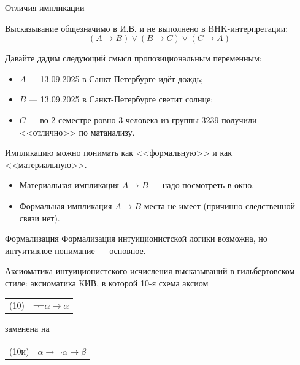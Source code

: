 \documentclass[aspectratio=169]{beamer}
\begin{document}
\begin{frame}{Отличия импликации}

Высказывание общезначимо в И.В. и не выполнено в BHK-интерпретации:
$$(A \rightarrow B) \vee (B \rightarrow C) \vee (C \rightarrow A)$$\pause

Давайте дадим следующий смысл пропозициональным переменным:
\begin{itemize}
\item $A$ --- 13.09.2025 в Санкт-Петербурге идёт дождь;
\item $B$ --- 13.09.2025 в Санкт-Петербурге светит солнце;
\item $C$ --- во 2 семестре ровно 3 человека из группы 3239 получили <<отлично>> по матанализу.
\end{itemize}\pause

Импликацию можно понимать как <<формальную>> и как <<материальную>>.
\begin{itemize}
\item Материальная импликация $A\rightarrow B$ --- надо посмотреть в окно.\pause

\item Формальная импликация $A\rightarrow B$ места не имеет (причинно-следственной связи нет).
\end{itemize}

\end{frame}

\begin{frame}{Формализация}
Формализация интуиционистской логики возможна, но интуитивное понимание --- основное.

\begin{defrus}Аксиоматика интуиционистского исчисления высказываний в гильбертовском стиле: 
аксиоматика КИВ, в которой 10-я схема аксиом

\begin{center}\begin{tabular}{ll}
(10) & $\neg \neg \alpha \rightarrow \alpha$
\end{tabular}\end{center}

заменена на 

\begin{center}\begin{tabular}{ll}
(10и) & $\alpha \rightarrow \neg\alpha \rightarrow \beta$
\end{tabular}\end{center}
\end{defrus}
\end{frame}
\end{document}
